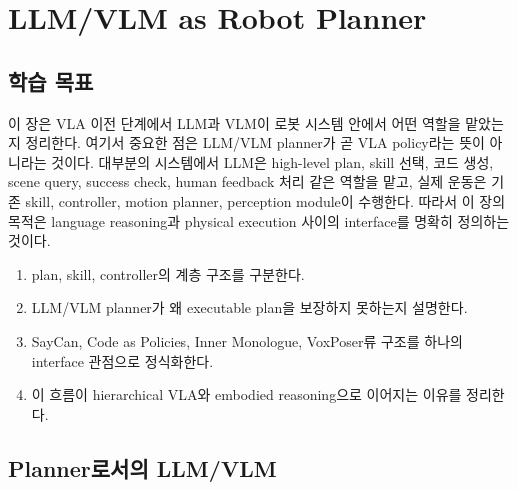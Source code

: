 \chapter{LLM/VLM as Robot Planner}

\section*{학습 목표}

이 장은 VLA 이전 단계에서 LLM과 VLM이 로봇 시스템 안에서 어떤 역할을 맡았는지 정리한다. 여기서 중요한 점은 LLM/VLM planner가 곧 VLA policy라는 뜻이 아니라는 것이다. 대부분의 시스템에서 LLM은 high-level plan, skill 선택, 코드 생성, scene query, success check, human feedback 처리 같은 역할을 맡고, 실제 운동은 기존 skill, controller, motion planner, perception module이 수행한다. 따라서 이 장의 목적은 language reasoning과 physical execution 사이의 interface를 명확히 정의하는 것이다.

\begin{enumerate}
  \item plan, skill, controller의 계층 구조를 구분한다.
  \item LLM/VLM planner가 왜 executable plan을 보장하지 못하는지 설명한다.
  \item SayCan, Code as Policies, Inner Monologue, VoxPoser류 구조를 하나의 interface 관점으로 정식화한다.
  \item 이 흐름이 hierarchical VLA와 embodied reasoning으로 이어지는 이유를 정리한다.
\end{enumerate}

\section{Planner로서의 LLM/VLM}

